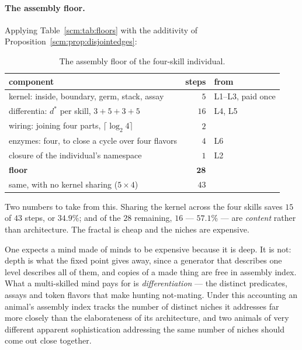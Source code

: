 \paragraph{The assembly floor.}
Applying Table~\ref{scm:tab:floors} with the additivity of
Proposition~\ref{scm:prop:disjointedges}:

\begin{table}[h]
\centering
\begin{tabular}{lrl}
\toprule
component & steps & from \\
\midrule
kernel: inside, boundary, germ, stack, assay & $5$ & L1--L3, paid once \\
differentia: $d^\ast$ per skill, $3+5+3+5$   & $16$ & L4, L5 \\
wiring: joining four parts, $\lceil \log_2 4\rceil$ & $2$ & \\
enzymes: four, to close a cycle over four flavors & $4$ & L6 \\
closure of the individual's namespace        & $1$ & L2 \\
\midrule
\textbf{floor} & $\mathbf{28}$ & \\
\midrule
same, with no kernel sharing ($5 \times 4$)  & $43$ & \\
\bottomrule
\end{tabular}
\caption{The assembly floor of the four-skill individual.}
\label{scm:tab:floor}
\end{table}

Two numbers to take from this. Sharing the kernel across the four skills
saves $15$ of $43$ steps, or $34.9\%$; and of the $28$ remaining, $16$ ---
$57.1\%$ --- are \emph{content} rather than architecture. The fractal is
cheap and the niches are expensive.

\begin{remark}
\label{scm:rmk:economy}
One expects a mind made of minds to be expensive because it is deep. It is
not: depth is what the fixed point gives away, since a generator that
describes one level describes all of them, and copies of a made thing are
free in assembly index. What a multi-skilled mind pays for is
\emph{differentiation} --- the distinct predicates, assays and token
flavors that make hunting not-mating. Under this accounting an animal's
assembly index tracks the number of distinct niches it addresses far more
closely than the elaborateness of its architecture, and two animals of
very different apparent sophistication addressing the same number of
niches should come out close together.
\end{remark}

